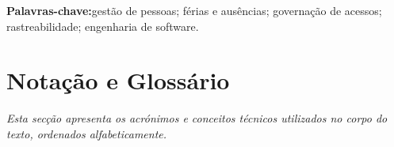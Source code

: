 \documentclass[12pt, a4paper, twoside, openright]{report}
\begin{document}
\bigskip
\noindent\textbf{Palavras-chave:}\quad gestão de pessoas; férias e ausências; governação de
acessos; rastreabilidade; engenharia de software.

\newpage

\tableofcontents

\newpage

\listoffigures
{}

\newpage

\listoftables
{}

\newpage

\chapter*{Notação e Glossário}

\textit{Esta secção apresenta os acrónimos e conceitos técnicos utilizados no corpo do
texto, ordenados alfabeticamente.}
\end{document}
